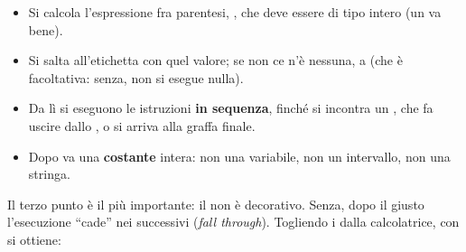 \begin{itemize}
  \item Si calcola l'espressione fra parentesi, , che deve essere
        di tipo intero (un  va bene).
  \item Si salta all'etichetta  con quel valore; se non ce n'è
        nessuna, a  (che è facoltativa: senza, non si esegue
        nulla).
  \item Da lì si eseguono le istruzioni \textbf{in sequenza}, finché si
        incontra un , che fa uscire dallo , o si
        arriva alla graffa finale.
  \item Dopo  va una \textbf{costante} intera: non una
        variabile, non un intervallo, non una stringa.
\end{itemize}

Il terzo punto è il più importante: il  non è decorativo. Senza,
dopo il  giusto l'esecuzione “cade” nei successivi
(\textit{fall through}). Togliendo i  dalla calcolatrice, con
 si ottiene:



